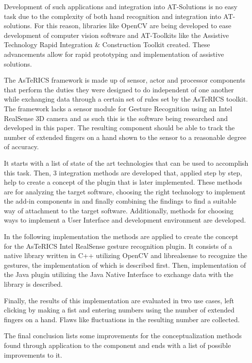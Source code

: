 \documentclass[BSA,Bachelor,english]{twbook}%
\begin{document}
Development of such applications and integration into AT-Solutions is no easy task due to the complexity of both hand recognition and integration into AT-solutions. For this reason, libraries like OpenCV are being developed to ease development of computer vision software and AT-Toolkits like the Assistive Technology Rapid Integration \& Construction Toolkit created. These advancements allow for rapid prototyping and implementation of assistive solutions.

The AsTeRICS framework is made up of sensor, actor and processor components that perform the duties they were designed to do independent of one another while exchanging data through a certain set of rules set by the AsTeRICS toolkit. The framework lacks a sensor module for Gesture Recognition using an Intel RealSense 3D camera and as such this is the software being researched and developed in this paper. The resulting component should be able to track the number of extended fingers on a hand shown to the sensor to a reasonable degree of accuracy.

It starts with a list of state of the art technologies that can be used to accomplish this task. Then, 3 integration methods are developed that, applied step by step, help to create a concept of the plugin that is later implemented. These methods are for analyzing the target software, choosing the right technology to implement the add-in components in and finally combining the findings to find a suitable way of attachment to the target software. Additionally, methods for choosing ways to implement a User Interface and development environment are developed.

In the following implementation the methods are applied to create the concept for the AsTeRICS Intel RealSense gesture recognition plugin. It consists of a native library written in C++ utilizing OpenCV and librealsense to recognize the gestures, the implementation of which is described first. Then, implementation of the Java plugin utilizing the Java Native Interface to exchange data with the library is described.

Finally, the results of this implementation are evaluated in two use cases, left clicking by making a fist and entering numbers using the number of extended fingers on a hand. Flaws like fluctuations in the resulting number are collected.

The final conclusion lists some improvements for the conceptualization methods found through application to the component and ends with a list of possible improvements to it.
\end{document}
